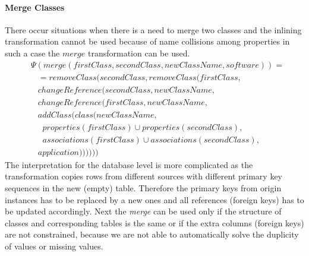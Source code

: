 \documentclass[runningheads]{comsis}
\begin{document}
\paragraph{Merge Classes}
There occur situations when there is a need to merge two classes and the inlining transformation cannot be used because of name collisions among properties in such a case the $merge$ transformation can be used. \begin{align}
& \Psi(merge(firstClass, secondClass, newClassName, software)) = \nonumber \\
& \; \; \; = removeClass(secondClass, removeClass(firstClass,\nonumber  \\
& \; \; \; changeReference(secondClass, newClassName, \nonumber \\
& \; \; \; changeReference(firstClass, newClassName,\nonumber  \\
& \; \; \; addClass(class(newClassName, \nonumber  \\
& \; \; \; \; \;properties(firstClass) \cup properties(secondClass), \nonumber  \\
& \; \; \;\; \;associations(firstClass) \cup associations(secondClass), \nonumber  \\
& \; \; \;application)))))) 
\end{align}
The interpretation for the database level is more complicated as the transformation copies rows from different sources with different primary key sequences in the new (empty) table. Therefore the primary keys from origin instances has to be replaced by a new ones and all references (foreign keys) has to be updated accordingly. Next the \emph{merge} can be used only if the structure of classes and corresponding tables is the same or if the extra columns (foreign keys) are not constrained, because we are not able to automatically solve the  duplicity of values or missing values.
\end{document}
